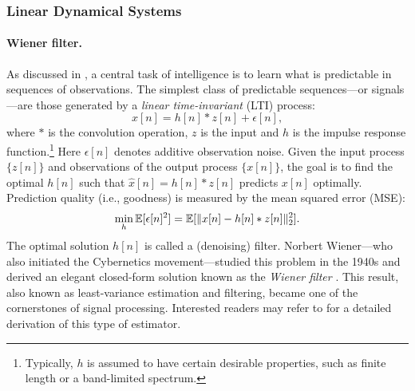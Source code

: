 \documentclass[../../book-main.tex]{subfiles}
\begin{document}
\subsubsection{Linear Dynamical Systems}
\label{sec:linear-systems}

\paragraph{Wiener filter.}

As discussed in , a central task of intelligence is to learn what is predictable in sequences of observations. The simplest class of predictable sequences---or signals---are those generated by a \textit{linear time-invariant} (LTI) process:
\begin{equation}
    x[n] = h[n]*z[n] + \epsilon[n], 
    \label{eqn:Wiener-model}
\end{equation}
where \(*\) is the convolution operation, \(z\) is the input and \(h\) is the impulse response function.\footnote{Typically, \(h\) is assumed to have certain desirable properties, such as finite length or a band-limited spectrum.} Here \(\epsilon[n]\) denotes additive observation noise. Given the input process \(\{z[n]\}\) and observations of the output process \(\{x[n]\}\), the goal is to find the optimal \(h[n]\) such that \(\hat{x}[n] = h[n]*z[n]\) predicts \(x[n]\) optimally. Prediction quality (i.e., goodness) is measured by the mean squared error (MSE):
\begin{equation}
    \min_{h} \operatorname{\mathbb{E}}[\epsilon[n]^{2}] = \operatorname{\mathbb{E}}[\|x[n] - h[n]*z[n]\|_{2}^{2}].
    \label{eqn:wiener-mse}
\end{equation}
The optimal solution \(h[n]\) is called a (denoising) filter. Norbert Wiener---who also initiated the Cybernetics movement---studied this problem in the 1940s and derived an elegant closed-form solution known as the \textit{Wiener filter} \cite{Wiener-1942,Wiener-1949}. This result, also known as least-variance estimation and filtering, became one of the cornerstones of signal processing. Interested readers may refer to \cite[Appendix B]{MaY2003} for a detailed derivation of this type of estimator.
\end{document}
